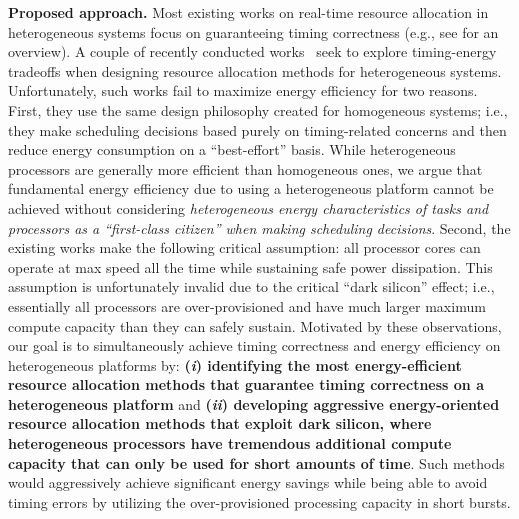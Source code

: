 \vspace{2mm} \noindent \textbf{Proposed approach.} 
Most existing works on real-time resource allocation in heterogeneous systems focus on guaranteeing timing correctness (e.g., see \cite{raravi2014task, raravi2013assigning, niemeier2011partitioned} for an overview). %
 A couple of recently conducted works~\cite{liuenergy, colin2014energy} seek to explore timing-energy tradeoffs when designing resource allocation methods for heterogeneous systems. 
 Unfortunately, such works fail to maximize energy efficiency for two reasons. First, they use the same design philosophy created for homogeneous systems; i.e., they make scheduling decisions based purely on timing-related concerns and then reduce energy consumption on a ``best-effort'' basis. While heterogeneous processors are generally more efficient than homogeneous ones, we argue that fundamental energy efficiency due to using a heterogeneous platform cannot be achieved without considering \textit{heterogeneous energy characteristics of tasks and processors as a ``first-class citizen'' when making scheduling decisions}. Second, the existing works make the following critical assumption: all processor cores can operate at max speed all the time while sustaining safe power dissipation.
  This assumption is unfortunately invalid due to the critical ``dark silicon'' effect; i.e., essentially all processors are over-provisioned and have much larger maximum compute capacity than they can safely sustain\cite{?}. Motivated by these observations, our goal is to simultaneously achieve timing correctness and energy efficiency on heterogeneous platforms by: \textbf{(\textit{i}) identifying the most energy-efficient resource allocation methods that guarantee timing correctness on a heterogeneous platform} and
   \textbf{(\textit{ii}) developing aggressive energy-oriented resource allocation methods that exploit dark silicon, where heterogeneous processors have tremendous additional compute capacity that can only be used for short amounts of time}. Such methods would aggressively achieve significant energy savings while being able to avoid timing errors by utilizing the over-provisioned processing capacity in short bursts.
  

